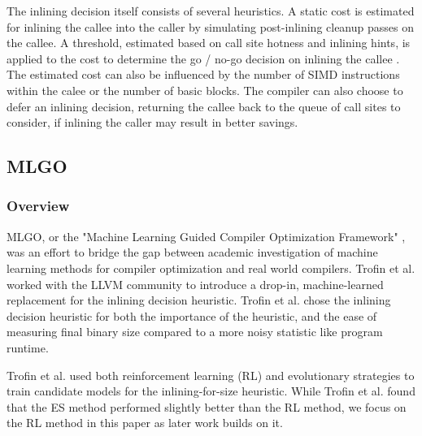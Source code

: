 \documentclass[nohyperref]{article}
\theoremstyle{plain}
\theoremstyle{definition}
\theoremstyle{remark}
\begin{document}
The inlining decision itself consists of several heuristics. A static cost is estimated for inlining the callee into the caller by simulating post-inlining cleanup passes on the callee. A threshold, estimated based on call site hotness and inlining hints, is applied to the cost to determine the go / no-go decision on inlining the callee \cite{mlgo}. The estimated cost can also be influenced by the number of SIMD instructions within the calee or the number of basic blocks. The compiler can also choose to defer an inlining decision, returning the callee back to the queue of call sites to consider, if inlining the caller may result in better savings.



\subsection{MLGO}
\subsubsection{Overview}
MLGO, or the "Machine Learning Guided Compiler Optimization Framework" \cite{mlgo}, was an effort to bridge the gap between academic investigation of machine learning methods for compiler optimization and real world compilers. Trofin et al. worked with the LLVM community to introduce a drop-in, machine-learned replacement for the inlining decision heuristic. Trofin et al. chose the inlining decision heuristic for both the importance of the heuristic, and the ease of measuring final binary size compared to a more noisy statistic like program runtime.

Trofin et al. used both reinforcement learning (RL) and evolutionary strategies to train candidate models for the inlining-for-size heuristic. While Trofin et al. found that the ES method performed slightly better than the RL method, we focus on the RL method in this paper as later work builds on it.
\end{document}
